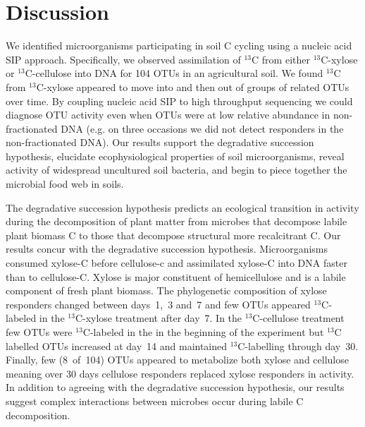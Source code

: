 \section{Discussion} 
We identified microorganisms participating in soil C cycling using a nucleic
acid SIP approach. Specifically, we observed assimilation of $^{13}$C from
either $^{13}$C-xylose or $^{13}$C-cellulose into DNA for 104 OTUs in an 
agricultural soil. We found $^{13}$C from $^{13}$C-xylose appeared to
move into and then out of groups of related OTUs over time. By coupling nucleic
acid SIP to high throughput sequencing we could diagnose OTU activity even when
OTUs were at low relative abundance in non-fractionated DNA (e.g. on three
occasions we did not detect responders in the non-fractionated DNA). Our
results support the degradative succession hypothesis, elucidate
ecophysiological properties of soil microorganisms, reveal activity of
widespread uncultured soil bacteria, and begin to piece together the microbial
food web in soils. 

The degradative succession hypothesis predicts an ecological transition in
activity during the decomposition of plant matter from microbes that decompose
labile plant biomass C to those that decompose structural more recalcitrant C.
Our results concur with the degradative succession hypothesis. Microorganisms
consumed xylose-C before cellulose-c and assimilated xylose-C into DNA faster
than to cellulose-C. Xylose is major constituent of hemicellulose and is
a labile component of fresh plant biomass. The phylogenetic composition of
xylose responders changed between days~1,~3 and~7 and few OTUs appeared
$^{13}$C-labeled in the $^{13}$C-xylose treatment after day~7. In the
$^{13}$C-cellulose treatment few OTUs were $^{13}$C-labeled in the in the
beginning of the experiment but $^{13}$C labelled OTUs increased at day~14 and
maintained $^{13}$C-labelling through day~30. Finally, few (8~of~104) OTUs
appeared to metabolize both xylose and cellulose meaning over 30 days cellulose
responders replaced xylose responders in activity. In
addition to agreeing with the degradative succession hypothesis, our results
suggest complex interactions between microbes occur during labile
C decomposition.


